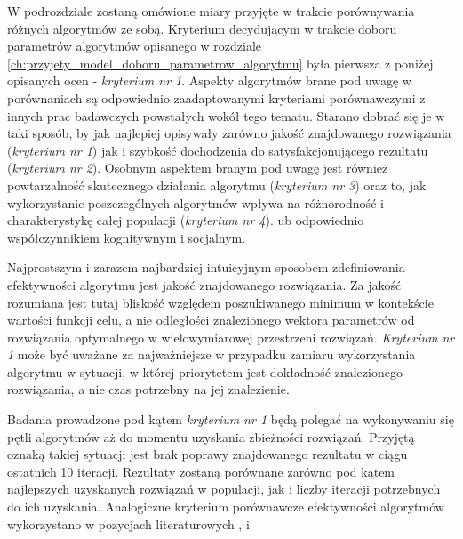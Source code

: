 \par
W podrozdziale zostaną omówione miary przyjęte w trakcie porównywania różnych algorytmów ze sobą. Kryterium decydującym w trakcie doboru parametrów algorytmów opisanego w rozdziale \ref{ch:przyjety_model_doboru_parametrow_algorytmu} była pierwsza z poniżej opisanych ocen - \emph{kryterium nr 1}. Aspekty algorytmów brane pod uwagę w porównaniach są odpowiednio zaadaptowanymi kryteriami porównawczymi z innych prac badawczych powstałych wokół tego tematu. Starano dobrać się je w taki sposób, by jak najlepiej opisywały zarówno jakość znajdowanego rozwiązania (\emph{kryterium nr 1}) jak i szybkość dochodzenia do satysfakcjonującego rezultatu (\emph{kryterium nr 2}). Osobnym aspektem branym pod uwagę jest również powtarzalność skutecznego działania algorytmu (\emph{kryterium nr 3}) oraz to, jak wykorzystanie poszczególnych algorytmów wpływa na różnorodność i charakterystykę całej populacji (\emph{kryterium nr 4}). ub odpowiednio współczynnikiem kognitywnym i socjalnym.

\par 
Najprostszym i zarazem najbardziej intuicyjnym sposobem zdefiniowania efektywności algorytmu jest jakość znajdowanego rozwiązania. Za jakość rozumiana jest tutaj bliskość względem poszukiwanego minimum w kontekście wartości funkcji celu, a nie odległości znalezionego wektora parametrów od rozwiązania optymalnego w wielowymiarowej przestrzeni rozwiązań. \emph{Kryterium nr 1} może być uważane za najważniejsze w przypadku zamiaru wykorzystania algorytmu w sytuacji, w której priorytetem jest dokładność znalezionego rozwiązania, a nie czas potrzebny na jej znalezienie. 
\par
Badania prowadzone pod kątem \emph{kryterium nr 1} będą polegać na wykonywaniu się pętli algorytmów aż do momentu uzyskania zbieżności rozwiązań. Przyjętą oznaką takiej sytuacji jest brak poprawy znajdowanego rezultatu w ciągu ostatnich 10 iteracji. Rezultaty zostaną porównane zarówno pod kątem najlepszych uzyskanych rozwiązań w populacji, jak i liczby iteracji potrzebnych do ich uzyskania. Analogiczne kryterium porównawcze efektywności algorytmów wykorzystano w pozycjach literaturowych \cite{boyabatli2004parameter}, \cite{elbeltagi2005comparison} i \cite{ong2006classification}

